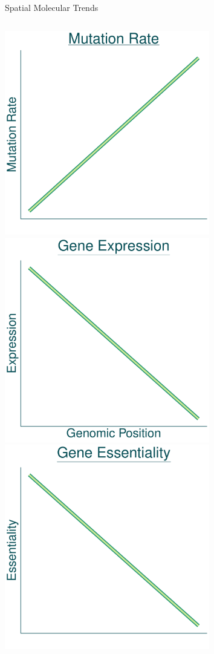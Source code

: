 \documentclass{beamer}
\begin{document}
\begin{frame}{Spatial Molecular Trends}
	\begin{columns}[t]
		\centering
		\includegraphics[width=0.67\textwidth]{./presentation_graphs/mut_graph.pdf}\\
		\includegraphics[width=0.67\textwidth]{./presentation_graphs/exp_graph.pdf}
		\centering
		\includegraphics[width=0.67\textwidth]{./presentation_graphs/ess_graph.pdf}\\

\end{columns}
\end{frame}
\end{document}
